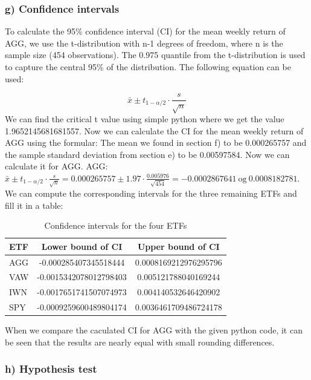 \documentclass{rapport}
\begin{document}
\noindent


\subsubsection*{\textbf{g)} Confidence intervals}
\noindent
To calculate the 95\% confidence interval (CI) for the mean weekly return of AGG, we use the t-distribution with 
n-1 degrees of freedom, where n is the sample size (454 observations). 
The 0.975 quantile from the t-distribution is used to capture the central 95\% of the distribution.
The following equation can be used:

\[
\bar{x} \pm t_{1-\alpha/2} \cdot \frac{s}{\sqrt{n}}
\]
\noindent
We can find the critical t value using simple python where we get the value 1.9652145681681557. 
Now we can calculate the CI for the mean weekly return of AGG using the formular:
The mean we found in section f) to be 0.000265757 and the sample standard deviation from section e) to be 0.00597584. Now we can calculate it for AGG.
AGG: $\bar{x} \pm t_{1-\alpha/2} \cdot \frac{s}{\sqrt{n}} = 0.000265757 \pm 1.97 \cdot \frac{0.005976}{\sqrt{454}} = -0.0002867641 \ \text{og} \ 0.0008182781$.
\noindent
We can compute the corresponding intervals for the three remaining ETFs and fill it in a table:

\begin{table}[H]
    \centering
    \begin{tabular}{|l|c|c|}
    \hline
    \textbf{ETF} & \textbf{Lower bound of CI} & \textbf{Upper bound of CI} \\ \hline
    AGG  & -0.000285407345518444 & 0.0008169212976295796 \\ \hline
    VAW  & -0.0015342078012798403 & 0.005121788040169244 \\ \hline
    IWN  & -0.0017651741507074973 & 0.004140532646420902 \\ \hline
    SPY  & -0.0009259600489804174 & 0.0036461709486724178 \\ \hline
    \end{tabular}
    \caption{Confidence intervals for the four ETFs}
\end{table}
\noindent
When we compare the caculated CI for AGG with the given python code, it can be seen that the results are nearly equal with small rounding differences. 

\subsubsection*{\textbf{h)} Hypothesis test}
\end{document}
